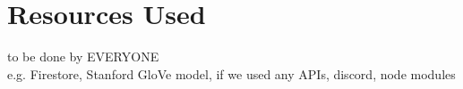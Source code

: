 \section{Resources Used}
to be done by EVERYONE\\
 e.g. Firestore, Stanford GloVe model, if we used any APIs, discord, node modules
